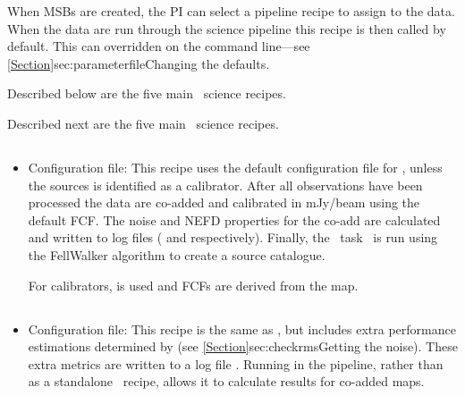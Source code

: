 \documentclass[11pt,oneside,chapters]{starlink}
\begin{document}
When MSBs are created, the PI can select a pipeline recipe to assign
to the data. When the data are run through the science pipeline this
recipe is then called by default. This can overridden on the command
line---see \cref{Section}{sec:parameterfile}{Changing the defaults}.
\begin{latexonly}
Described below are the five main \oracdr\ science recipes.
\end{latexonly}
\begin{htmlonly}
Described next are the five main \oracdr\ science recipes.
\end{htmlonly}

\subsection{}
\begin{itemize}
\item  Configuration file: 
\newline\newline
This recipe uses the default configuration file for \makemap, unless
the sources is identified as a calibrator. After all observations have
been processed the data are co-added and calibrated in mJy/beam using the
default FCF. The noise and NEFD properties for the co-add are calculated
and written to log files ( and 
respectively). Finally, the \cupid\ task \findclumps\ is run using the
FellWalker algorithm to create a source catalogue.

For calibrators,  is used and
FCFs are derived from the map.
\end{itemize}

\subsection{}
\begin{itemize}
\item  Configuration file: 
\newline\newline
This recipe is the same as , but includes extra
performance estimations determined by  (see
\cref{Section}{sec:checkrms}{Getting the noise}). These extra metrics
are written to a log file . Running 
in the pipeline, rather than as a standalone \picard\ recipe, allows it
to calculate results for co-added maps.
\end{itemize}
\end{document}
